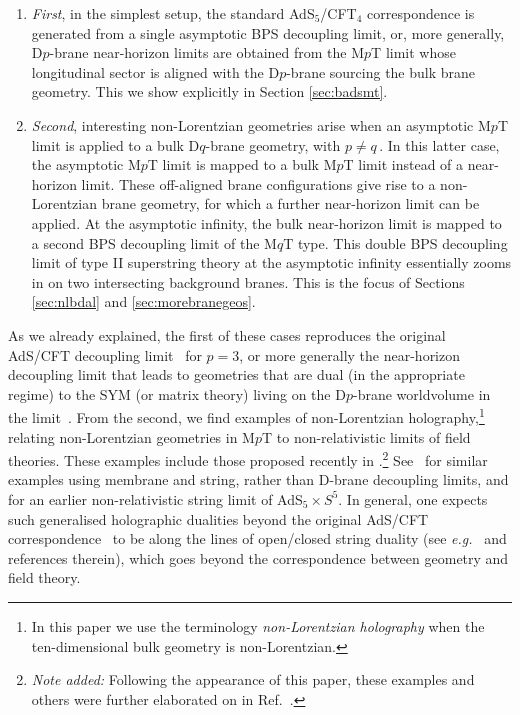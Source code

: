\documentclass[11pt]{article}
\renewcommand{\emph}[1]{\textit{#1}}
\begin{document}
%
\begin{enumerate}[(1)]

\item

\emph{First}, in the simplest setup, the standard AdS${}_{5}$/CFT${}_{4}$ 
correspondence is generated from a single asymptotic BPS decoupling limit, or, more generally, D$p$-brane near-horizon limits are obtained from the M$p$T limit whose longitudinal sector is aligned with the D$p$-brane sourcing the bulk brane geometry. 
This we show explicitly in Section \ref{sec:badsmt}.

\item

\emph{Second}, interesting non-Lorentzian geometries arise when an asymptotic M$p$T limit is applied to a bulk D$q$-brane geometry, with $p \neq q$\,. In this latter case, the asymptotic M$p$T limit is mapped to a bulk M$p$T limit instead of a near-horizon limit. These off-aligned brane configurations give rise to a non-Lorentzian brane geometry, for which a further near-horizon limit can be applied. At the asymptotic infinity, the bulk near-horizon limit is mapped to a second BPS decoupling limit of the M$q$T type. This double BPS decoupling limit of type II superstring theory at the asymptotic infinity essentially zooms in on two intersecting background branes. 
This is the focus of Sections \ref{sec:nlbdal} and \ref{sec:morebranegeos}.

\end{enumerate}

\noindent As we already explained, the first of these cases reproduces the original AdS/CFT decoupling limit~\cite{Maldacena:1997re} for $p=3$, or more generally the near-horizon decoupling limit that leads to geometries that are dual (in the appropriate regime) to the SYM (or matrix theory) living on the D$p$-brane worldvolume in the limit~\cite{Itzhaki:1998dd}.
From the second, we find examples of non-Lorentzian holography,\footnote{In this paper we use the terminology \emph{non-Lorentzian holography} when the ten-dimensional bulk geometry is non-Lorentzian.} relating non-Lorentzian geometries in M$p$T to non-relativistic limits of field theories.
These examples include those proposed recently in \cite{Lambert:2024yjk}.\footnote{\emph{Note added:} Following the appearance of this paper, these examples and others were further elaborated on in Ref.~\cite{Lambert:2024ncn}.} See~\cite{Lambert:2024uue, Fontanella:2024rvn, Fontanella:2024kyl}
for similar examples using membrane and string, rather than D-brane decoupling limits, and \cite{Gomis:2005pg} for an earlier non-relativistic string limit of AdS${}_5 \times S^5$. In general, one expects such generalised holographic dualities beyond the original AdS/CFT correspondence~\cite{Maldacena:1997re} to be along the lines of open/closed string duality (see \emph{e.g.}~\cite{Niarchos:2015moa} and references therein), which goes beyond the correspondence between geometry and field theory.  
\end{document}
